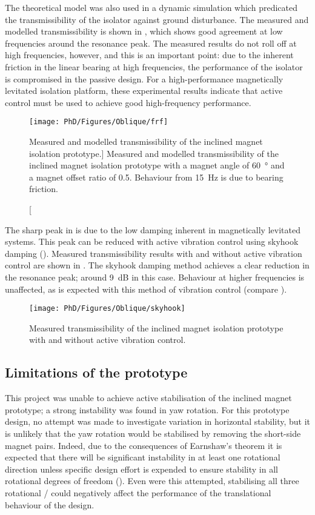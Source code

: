 \documentclass[11pt,a4paper]{memoir}
\begin{document}
The theoretical model was also used in a dynamic simulation which predicated the transmissibility of the isolator against ground disturbance.
The measured and modelled transmissibility is shown in , which shows good agreement at low frequencies around the resonance peak.
The measured results do not roll off at high frequencies, however, and this is an important point: due to the inherent friction in the linear bearing at high frequencies, the performance of the isolator is compromised in the passive design.
For a high-performance magnetically levitated isolation platform, these experimental results indicate that active control must be used to achieve good high-frequency performance.

\begin{figure}
\centering
\texttt{[image: PhD/Figures/Oblique/frf]}
\caption
[Measured and modelled transmissibility of the inclined magnet isolation prototype.]
{Measured and modelled transmissibility of the inclined magnet isolation prototype with a magnet angle of \SI{60}{\degree} and a magnet offset ratio of \num{0.5}. Behaviour from \SI{15}{Hz} is due to bearing friction.}
\end{figure}

The sharp peak in  is due to the low damping inherent in magnetically levitated systems.
This peak can be reduced with active vibration control using skyhook damping ().
Measured transmissibility results with and without active vibration control are shown in .
The skyhook damping method achieves a clear reduction in the resonance peak; around \SI{9}{dB} in this case.
Behaviour at higher frequencies is unaffected, as is expected with this method of vibration control (compare ).

\begin{figure}
\centering
\texttt{[image: PhD/Figures/Oblique/skyhook]}
\caption{Measured transmissibility of the inclined magnet isolation prototype with and without active vibration control.}
\end{figure}

\subsection{Limitations of the prototype}

This project was unable to achieve active stabilisation of the inclined magnet prototype; a strong instability was found in yaw rotation.
For this prototype design, no attempt was made to investigate variation in horizontal stability, but it is unlikely that the yaw rotation would be stabilised by removing the short-side magnet pairs.
Indeed, due to the consequences of Earnshaw's theorem it is expected that there will be significant instability in at least one rotational direction unless specific design effort is expended to ensure stability in all rotational degrees of freedom ().
Even were this attempted, stabilising all three rotational \dofs/ could negatively affect the performance of the translational behaviour of the design.
\end{document}
